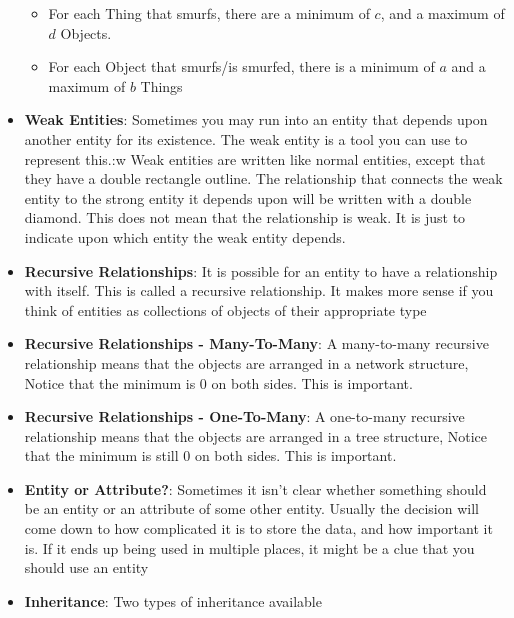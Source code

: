 \documentclass{report}
\begin{document}
\begin{itemize}
            \begin{itemize}
                \item For each Thing that smurfs, there are a minimum of $c$, and a maximum of $d$ Objects.
                \item For each Object that smurfs/is smurfed, there is a minimum of $a$ and a maximum of $b$ Things
            \end{itemize}
            \bigbreak \noindent 
        \item \textbf{Weak Entities}: Sometimes you may run into an entity that depends upon another entity for its existence. The weak entity is a tool you can use to represent this.:w
            \bigbreak \noindent 
            Weak entities are written like normal entities, except that they have a double rectangle outline. The relationship
that connects the weak entity to the strong entity it depends upon will be written with a double diamond. This
does not mean that the relationship is weak. It is just to indicate upon which entity the weak entity depends.
\bigbreak \noindent 
{}
        \item \textbf{Recursive Relationships}: It is possible for an entity to have a relationship with itself. This is called a recursive relationship. It makes more sense if you think of entities as collections of objects of their appropriate type
        \item \textbf{Recursive Relationships - Many-To-Many}: A many-to-many recursive relationship means that the objects are arranged in a network structure, Notice that the minimum is 0 on both sides. This is important.
            \bigbreak \noindent 
        \item \textbf{Recursive Relationships - One-To-Many}: A one-to-many recursive relationship means that the objects are arranged in a tree structure, Notice that the minimum is still 0 on both sides. This is important.
            \bigbreak \noindent 
        \item \textbf{Entity or Attribute?}: 
            Sometimes it isn’t clear whether something should be an entity or an attribute of some other entity. Usually the
decision will come down to how complicated it is to store the data, and how important it is. If it ends up being used
in multiple places, it might be a clue that you should use an entity
        \item \textbf{Inheritance}: Two types of inheritance available

\end{itemize}
\end{document}
